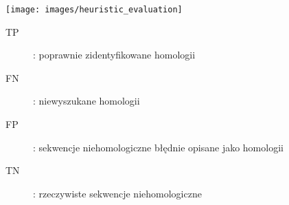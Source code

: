 \begin{frame}
\begin{multicols}{2}


\begin{center}
\color{black}
\texttt{[image: images/heuristic\_evaluation]}
\end{center}

\raggedright
\begin{description}

 \item[TP]: poprawnie zidentyfikowane homologii
 \item[FN]: niewyszukane homologii
 \item[FP]: sekwencje niehomologiczne błędnie opisane jako homologii
 \item[TN]: rzeczywiste sekwencje niehomologiczne

\end{description}
\end{multicols}
\end{frame}




